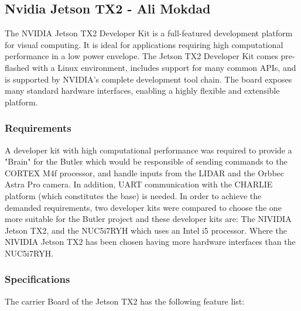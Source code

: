 \subsection{Nvidia Jetson TX2 - Ali Mokdad}
The NVIDIA Jetson TX2\cite{Board} Developer Kit is a full-featured development platform for visual computing. It is ideal for applications requiring high computational performance in a low power envelope. The Jetson TX2 Developer Kit comes pre-flashed with a Linux environment, includes support for many common APIs, and is supported by NVIDIA’s complete development tool chain. The board exposes many standard hardware interfaces, enabling a highly flexible and extensible platform.

\subsubsection{Requirements}
A developer kit with high computational performance was required to provide a "Brain" for the Butler which would be responsible of sending commands to the CORTEX M4f processor, and handle inputs from the LIDAR and the Orbbec Astra Pro camera. In addition, UART communication with the CHARLIE platform (which constitutes the base) is needed.
In order to achieve the demanded requirements, two developer kits were compared to choose the one more suitable for the Butler project and these developer kits are: The NIVIDIA Jetson TX2, and the NUC5i7RYH which uses an Intel i5 processor. Where the NIVIDIA Jetson TX2 has been chosen having more hardware interfaces than the NUC5i7RYH.

\subsubsection{Specifications}
The carrier Board of the Jetson TX2 has the following feature list:

